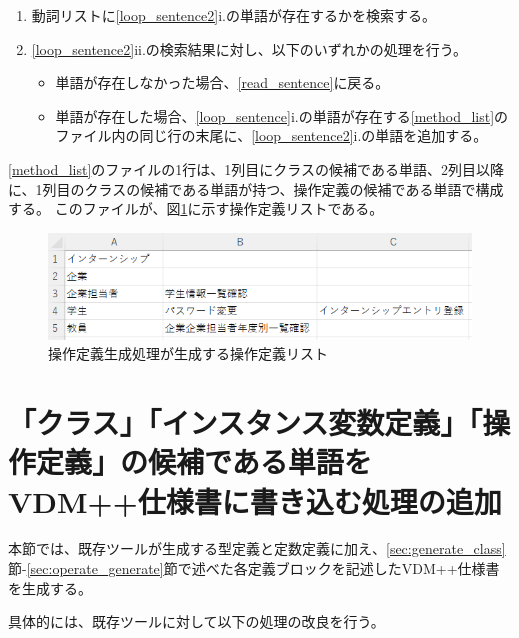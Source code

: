 \begin{enumerate}
\begin{enumerate}
\begin{enumerate}
                    \item 動詞リストに\ref{loop_sentence2}i.の単語が存在するかを検索する。
                    \label{search_doshi_word}
                    \item \ref{loop_sentence2}ii.の検索結果に対し、以下のいずれかの処理を行う。
                        \begin{itemize}
                            \item 単語が存在しなかった場合、\ref{read_sentence}に戻る。
                            \item 単語が存在した場合、\ref{loop_sentence}i.の単語が存在する\ref{method_list}のファイル内の同じ行の末尾に、\ref{loop_sentence2}i.の単語を追加する。
                        \end{itemize}
                \end{enumerate}
        \end{enumerate}
\end{enumerate}

\ref{method_list}のファイルの1行は、1列目にクラスの候補である単語、2列目以降に、1列目のクラスの候補である単語が持つ、操作定義の候補である単語で構成する。
このファイルが、図\ref{fig:operate_list}に示す操作定義リストである。

\begin{figure}[t]
    \begin{center}
        \includegraphics[width=1.0\columnwidth]{image/operate_list.png}
        \caption{操作定義生成処理が生成する操作定義リスト}
        \label{fig:operate_list}
    \end{center}
\end{figure}

\section{「クラス」「インスタンス変数定義」「操作定義」の候補である単語をVDM++仕様書に書き込む処理の追加}
本節では、既存ツールが生成する型定義と定数定義に加え、\ref{sec:generate_class}節-\ref{sec:operate_generate}節で述べた各定義ブロックを記述したVDM++仕様書を生成する。

具体的には、既存ツールに対して以下の処理の改良を行う。

